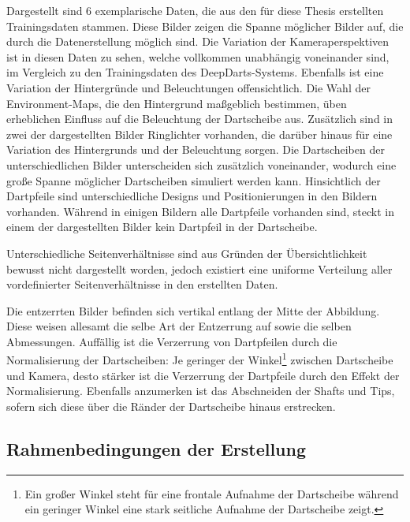 Dargestellt sind 6 exemplarische Daten, die aus den für diese Thesis erstellten Trainingsdaten stammen. Diese Bilder zeigen die Spanne möglicher Bilder auf, die durch die Datenerstellung möglich sind. Die Variation der Kameraperspektiven ist in diesen Daten zu sehen, welche vollkommen unabhängig voneinander sind, im Vergleich zu den Trainingsdaten des DeepDarts-Systems. Ebenfalls ist eine Variation der Hintergründe und Beleuchtungen offensichtlich. Die Wahl der Environment-Maps, die den Hintergrund maßgeblich bestimmen, üben erheblichen Einfluss auf die Beleuchtung der Dartscheibe aus. Zusätzlich sind in zwei der dargestellten Bilder Ringlichter vorhanden, die darüber hinaus für eine Variation des Hintergrunds und der Beleuchtung sorgen. Die Dartscheiben der unterschiedlichen Bilder unterscheiden sich zusätzlich voneinander, wodurch eine große Spanne möglicher Dartscheiben simuliert werden kann. Hinsichtlich der Dartpfeile sind unterschiedliche Designs und Positionierungen in den Bildern vorhanden. Während in einigen Bildern alle Dartpfeile vorhanden sind, steckt in einem der dargestellten Bilder kein Dartpfeil in der Dartscheibe.

Unterschiedliche Seitenverhältnisse sind aus Gründen der Übersichtlichkeit bewusst nicht dargestellt worden, jedoch existiert eine uniforme Verteilung aller vordefinierter Seitenverhältnisse in den erstellten Daten.

Die entzerrten Bilder befinden sich vertikal entlang der Mitte der Abbildung. Diese weisen allesamt die selbe Art der Entzerrung auf sowie die selben Abmessungen. Auffällig ist die Verzerrung von Dartpfeilen durch die Normalisierung der Dartscheiben: Je geringer der Winkel\footnote{Ein großer Winkel steht für eine frontale Aufnahme der Dartscheibe während ein geringer Winkel eine stark seitliche Aufnahme der Dartscheibe zeigt.} zwischen Dartscheibe und Kamera, desto stärker ist die Verzerrung der Dartpfeile durch den Effekt der Normalisierung. Ebenfalls anzumerken ist das Abschneiden der Shafts und Tips, sofern sich diese über die Ränder der Dartscheibe hinaus erstrecken.


\subsection{Rahmenbedingungen der Erstellung}  %
\label{sec:render_info}

